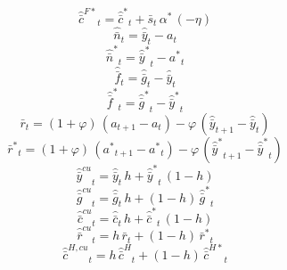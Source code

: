 \begin{dmath}
{{\hat {\bar c}^{F*}}}_{t}={{\hat {\bar c}^*}}_{t}+{{\bar s}}_{t}\, {{\alpha^*}}\, \left(-{{\eta}}\right)
\end{dmath}
\begin{dmath}
{{\hat {\bar n}}}_{t}={{\hat {\bar y}}}_{t}-{{a}}_{t}
\end{dmath}
\begin{dmath}
{{\hat {\bar n}^*}}_{t}={{\hat {\bar y}^*}}_{t}-{{a^*}}_{t}
\end{dmath}
\begin{dmath}
{{\hat {\bar f}}}_{t}={{\hat {\bar g}}}_{t}-{{\hat {\bar y}}}_{t}
\end{dmath}
\begin{dmath}
{{\hat {\bar f}^*}}_{t}={{\hat {\bar g}^*}}_{t}-{{\hat {\bar y}^*}}_{t}
\end{dmath}
\begin{dmath}
{{\bar r}}_{t}=\left(1+{{\varphi}}\right)\, \left({{a}}_{t+1}-{{a}}_{t}\right)-{{\varphi}}\, \left({{\hat {\bar y}}}_{t+1}-{{\hat {\bar y}}}_{t}\right)
\end{dmath}
\begin{dmath}
{{\bar r^*}}_{t}=\left(1+{{\varphi}}\right)\, \left({{a^*}}_{t+1}-{{a^*}}_{t}\right)-{{\varphi}}\, \left({{\hat {\bar y}^*}}_{t+1}-{{\hat {\bar y}^*}}_{t}\right)
\end{dmath}
\begin{dmath}
{{\hat {\bar y}^{cu}}}_{t}={{\hat {\bar y}}}_{t}\, {{h}}+{{\hat {\bar y}^*}}_{t}\, \left(1-{{h}}\right)
\end{dmath}
\begin{dmath}
{{\hat {\bar g}^{cu}}}_{t}={{\hat {\bar g}}}_{t}\, {{h}}+\left(1-{{h}}\right)\, {{\hat {\bar g}^*}}_{t}
\end{dmath}
\begin{dmath}
{{\hat {\bar c}^{cu}}}_{t}={{\hat {\bar c}}}_{t}\, {{h}}+{{\hat {\bar c}^*}}_{t}\, \left(1-{{h}}\right)
\end{dmath}
\begin{dmath}
{{\hat {\bar r}^{cu}}}_{t}={{h}}\, {{\bar r}}_{t}+\left(1-{{h}}\right)\, {{\bar r^*}}_{t}
\end{dmath}
\begin{dmath}
{{\hat {\bar c}^{H,cu}}}_{t}={{h}}\, {{\hat {\bar c}^H}}_{t}+\left(1-{{h}}\right)\, {{\hat {\bar c}^{H*}}}_{t}
\end{dmath}
